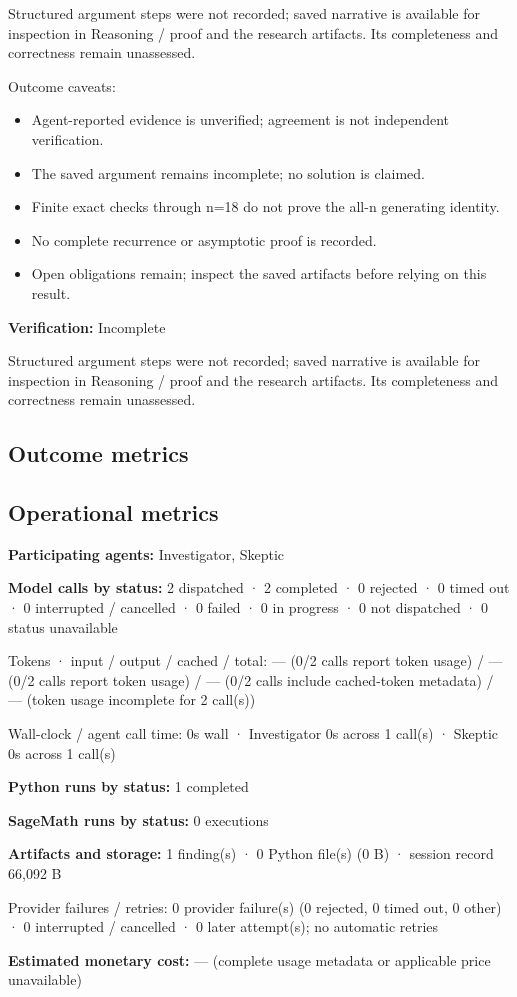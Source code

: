 \documentclass[11pt]{article}
\begin{document}
Structured argument steps were not recorded; saved narrative is available for inspection in Reasoning / proof and the research artifacts. Its completeness and correctness remain unassessed.\par
Outcome caveats:\par
\begin{itemize}
\item Agent-reported evidence is unverified; agreement is not independent verification.
\item The saved argument remains incomplete; no solution is claimed.
\item Finite exact checks through n=18 do not prove the all-n generating identity.
\item No complete recurrence or asymptotic proof is recorded.
\item Open obligations remain; inspect the saved artifacts before relying on this result.
\end{itemize}
\textbf{Verification:} Incomplete\par
Structured argument steps were not recorded; saved narrative is available for inspection in Reasoning / proof and the research artifacts. Its completeness and correctness remain unassessed.\par
\subsection{Outcome metrics}
\subsection{Operational metrics}
\textbf{Participating agents:} Investigator, Skeptic\par
\textbf{Model calls by status:} 2 dispatched · 2 completed · 0 rejected · 0 timed out · 0 interrupted / cancelled · 0 failed · 0 in progress · 0 not dispatched · 0 status unavailable\par
Tokens · input / output / cached / total: — (0/2 calls report token usage) / — (0/2 calls report token usage) / — (0/2 calls include cached-token metadata) / — (token usage incomplete for 2 call(s))\par
Wall-clock / agent call time: 0s wall · Investigator 0s across 1 call(s) · Skeptic 0s across 1 call(s)\par
\textbf{Python runs by status:} 1 completed\par
\textbf{SageMath runs by status:} 0 executions\par
\textbf{Artifacts and storage:} 1 finding(s) · 0 Python file(s) (0 B) · session record 66,092 B\par
Provider failures / retries: 0 provider failure(s) (0 rejected, 0 timed out, 0 other) · 0 interrupted / cancelled · 0 later attempt(s); no automatic retries\par
\textbf{Estimated monetary cost:} — (complete usage metadata or applicable price unavailable)\par
\end{document}
